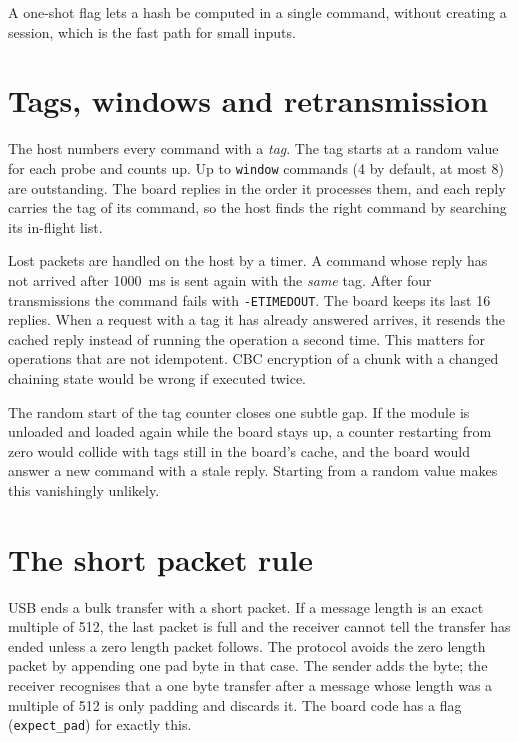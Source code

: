 \documentclass[11pt,a4paper,oneside]{report}
\newcommand{\code}[1]{\texttt{\small #1}}
\begin{document}
A one-shot flag lets a hash be computed in a single command, without creating a session, which is the fast path for small inputs.

\section{Tags, windows and retransmission}

The host numbers every command with a \emph{tag}. The tag starts at a random value for each probe and counts up. Up to \code{window} commands (4 by default, at most 8) are outstanding. The board replies in the order it processes them, and each reply carries the tag of its command, so the host finds the right command by searching its in-flight list.

Lost packets are handled on the host by a timer. A command whose reply has not arrived after 1000~ms is sent again with the \emph{same} tag. After four transmissions the command fails with \code{-ETIMEDOUT}. The board keeps its last 16 replies. When a request with a tag it has already answered arrives, it resends the cached reply instead of running the operation a second time. This matters for operations that are not idempotent. CBC encryption of a chunk with a changed chaining state would be wrong if executed twice.

The random start of the tag counter closes one subtle gap. If the module is unloaded and loaded again while the board stays up, a counter restarting from zero would collide with tags still in the board's cache, and the board would answer a new command with a stale reply. Starting from a random value makes this vanishingly unlikely.

\section{The short packet rule}\label{sec:pad}

USB ends a bulk transfer with a short packet. If a message length is an exact multiple of 512, the last packet is full and the receiver cannot tell the transfer has ended unless a zero length packet follows. The protocol avoids the zero length packet by appending one pad byte in that case. The sender adds the byte; the receiver recognises that a one byte transfer after a message whose length was a multiple of 512 is only padding and discards it. The board code has a flag (\code{expect\_pad}) for exactly this.


\end{document}
